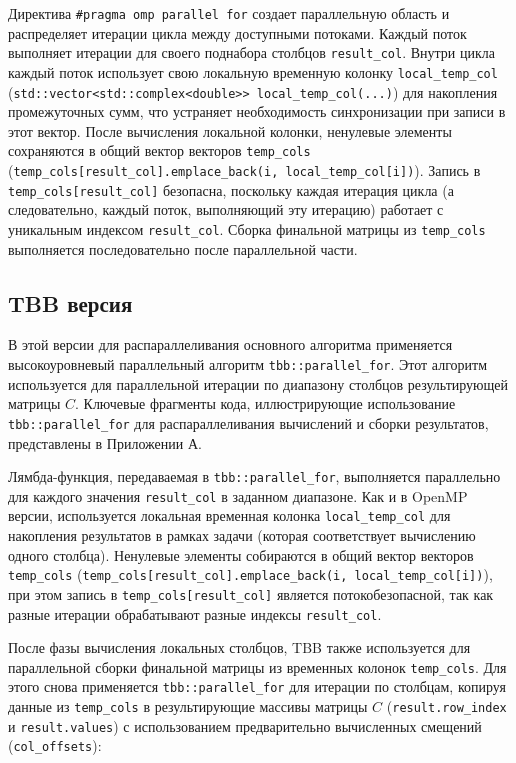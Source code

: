\documentclass[12pt]{article}
\begin{document}
Директива \lstinline{#pragma omp parallel for} создает параллельную область и распределяет итерации цикла между доступными потоками. Каждый поток выполняет итерации для своего поднабора столбцов \lstinline{result_col}. Внутри цикла каждый поток использует свою локальную временную колонку \lstinline{local_temp_col} (\lstinline{std::vector<std::complex<double>> local_temp_col(...)}) для накопления промежуточных сумм, что устраняет необходимость синхронизации при записи в этот вектор. После вычисления локальной колонки, ненулевые элементы сохраняются в общий вектор векторов \lstinline{temp_cols} (\lstinline{temp_cols[result_col].emplace_back(i, local_temp_col[i])}). Запись в \lstinline{temp_cols[result_col]} безопасна, поскольку каждая итерация цикла (а следовательно, каждый поток, выполняющий эту итерацию) работает с уникальным индексом \lstinline{result_col}. Сборка финальной матрицы из \lstinline{temp_cols} выполняется последовательно после параллельной части.

\subsection{TBB версия}
В этой версии для распараллеливания основного алгоритма применяется высокоуровневый параллельный алгоритм \lstinline{tbb::parallel_for}. Этот алгоритм используется для параллельной итерации по диапазону столбцов результирующей матрицы $C$. Ключевые фрагменты кода, иллюстрирующие использование \lstinline{tbb::parallel_for} для распараллеливания вычислений и сборки результатов, представлены в Приложении А.

Лямбда-функция, передаваемая в \lstinline{tbb::parallel_for}, выполняется параллельно для каждого значения \lstinline{result_col} в заданном диапазоне. Как и в OpenMP версии, используется локальная временная колонка \lstinline{local_temp_col} для накопления результатов в рамках задачи (которая соответствует вычислению одного столбца). Ненулевые элементы собираются в общий вектор векторов \lstinline{temp_cols} (\lstinline{temp_cols[result_col].emplace_back(i, local_temp_col[i])}), при этом запись в \lstinline{temp_cols[result_col]} является потокобезопасной, так как разные итерации обрабатывают разные индексы \lstinline{result_col}.

После фазы вычисления локальных столбцов, TBB также используется для параллельной сборки финальной матрицы из временных колонок \lstinline{temp_cols}. Для этого снова применяется \lstinline{tbb::parallel_for} для итерации по столбцам, копируя данные из \lstinline{temp_cols} в результирующие массивы матрицы $C$ (\lstinline{result.row_index} и \lstinline{result.values}) с использованием предварительно вычисленных смещений (\lstinline{col_offsets}):
\end{document}
